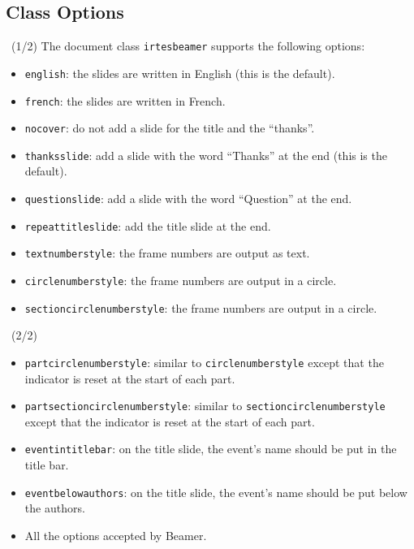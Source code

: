 \documentclass[english,circlenumberstyle]{irtesbeamer}
\begin{document}
\subsection{Class Options}
\begin{frame}{\subsecname~(1/2)}\smaller
	The document class \texttt{irtesbeamer} supports the following options:
	\begin{itemize}
	\item \texttt{english}: the slides are written in English (this is the default).
	\item \texttt{french}: the slides are written in French.
	\item \texttt{nocover}: do not add a slide for the title and the ``thanks''.
	\item \texttt{thanksslide}: add a slide with the word ``Thanks'' at the end (this is the default). 
	\item \texttt{questionslide}: add a slide with the word ``Question'' at the end. 
	\item \texttt{repeattitleslide}: add the title slide at the end.
	\item \texttt{textnumberstyle}: the frame numbers are output as text.\hfill\hyperlink{progressbartypes}{}
	\item \texttt{circlenumberstyle}: the frame numbers are output in a circle.\hfill\hyperlink{progressbartypes}{}
	\item \texttt{sectioncirclenumberstyle}: the frame numbers are output in a circle.\hfill\hyperlink{progressbartypes}{}
 	\end{itemize}
\end{frame}

\begin{frame}{\subsecname~(2/2)}\smaller
	\begin{itemize}
	\item \texttt{partcirclenumberstyle}: similar to \texttt{circlenumberstyle} except that the indicator is reset at the start of each part.
	\item \texttt{partsectioncirclenumberstyle}: similar to \texttt{sectioncirclenumberstyle} except that the indicator is reset at the start of each part.
	\item \texttt{eventintitlebar}: on the title slide, the event's name should be put in the title bar.
	\item \texttt{eventbelowauthors}: on the title slide, the event's name should be put below the authors.
	\item All the options accepted by Beamer.
 	\end{itemize}
\end{frame}
\end{document}
